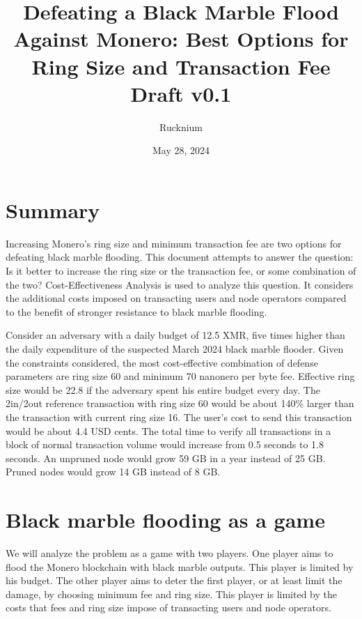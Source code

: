 \documentclass[english]{article}
\begin{document}
\title{Defeating a Black Marble Flood Against Monero: Best Options for Ring Size and Transaction Fee\\\vspace{.3cm}
\large Draft v0.1\vspace{-.715cm}}
\author{Rucknium }
\date{May 28, 2024}




\maketitle

\section{Summary}

Increasing Monero's ring size and minimum transaction fee are two
options for defeating black marble flooding. This document attempts
to answer the question: Is it better to increase the ring size or
the transaction fee, or some combination of the two? Cost-Effectiveness
Analysis is used to analyze this question. It considers the additional
costs imposed on transacting users and node operators compared to
the benefit of stronger resistance to black marble flooding.

Consider an adversary with a daily budget of 12.5 XMR, five times
higher than the daily expenditure of the suspected March 2024 black
marble flooder. Given the constraints considered, the most cost-effective
combination of defense parameters are ring size 60 and minimum 70
nanonero per byte fee. Effective ring size would be 22.8 if the adversary
spent his entire budget every day. The 2in/2out reference transaction
with ring size 60 would be about 140\% larger than the transaction
with current ring size 16. The user's cost to send this transaction
would be about 4.4 USD cents. The total time to verify all transactions
in a block of normal transaction volume would increase from 0.5 seconds
to 1.8 seconds. An unpruned node would grow 59 GB in a year instead
of 25 GB. Pruned nodes would grow 14 GB instead of 8 GB. 

\section{Black marble flooding as a game}

We will analyze the problem as a game with two players. One player
aims to flood the Monero blockchain with black marble outputs. This
player is limited by his budget. The other player aims to deter the
first player, or at least limit the damage, by choosing minimum fee
and ring size. This player is limited by the costs that fees and ring
size impose of transacting users and node operators.
\end{document}
